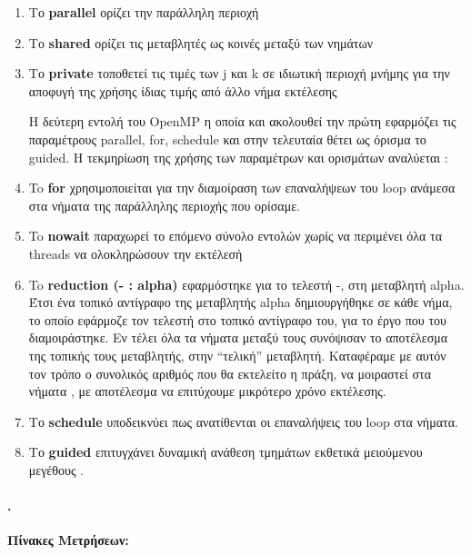 \documentclass[greek,booktabs,8pt,flagBlueCMYK]{report}
\begin{document}
\begin{enumerate}
  \item Το \textbf{parallel} ορίζει την παράλληλη περιοχή
  \item Το \textbf{shared} ορίζει τις μεταβλητές ως κοινές μεταξύ των νημάτων
  \item Το \textbf{private} τοποθετεί τις τιμές των j και k σε ιδιωτική περιοχή μνήμης για την αποφυγή της χρήσης ίδιας τιμής από άλλο νήμα εκτέλεσης \newline

Η δεύτερη εντολή του OpenMP η οποία και ακολουθεί την πρώτη εφαρμόζει τις παραμέτρους parallel, for, schedule και στην τελευταία θέτει ως όρισμα το guided. Η τεκμηρίωση της χρήσης των παραμέτρων και ορισμάτων αναλύεται :

  \item To \textbf{for} χρησιμοποιείται για την διαμοίραση των επαναλήψεων του loop ανάμεσα στα νήματα της παράλληλης περιοχής που ορίσαμε.
  \item To \textbf{nowait} παραχωρεί το επόμενο σύνολο εντολών χωρίς να περιμένει όλα τα threads να ολοκληρώσουν την εκτέλεσή
  \item To \textbf{reduction (- : alpha)}  εφαρμόστηκε για το τελεστή -, στη μεταβλητή alpha. Έτσι ένα τοπικό αντίγραφο της μεταβλητής alpha
        δημιουργήθηκε σε κάθε νήμα, το οποίο εφάρμοζε τον τελεστή στο τοπικό αντίγραφο του, για το έργο που του διαμοιράστηκε.
        Εν τέλει όλα τα νήματα μεταξύ τους συνόψισαν το αποτέλεσμα της τοπικής τους μεταβλητής, στην “τελική” μεταβλητή.
        Καταφέραμε με αυτόν τον τρόπο ο συνολικός αριθμός που θα εκτελείτο η πράξη, να μοιραστεί στα νήματα , με αποτέλεσμα να
        επιτύχουμε μικρότερο χρόνο εκτέλεσης.
  \item Το \textbf{schedule} υποδεικνύει πως ανατίθενται οι επαναλήψεις του loop στα νήματα.
  \item Το \textbf{guided} επιτυγχάνει δυναμική ανάθεση τμημάτων εκθετικά μειούμενου μεγέθους .
\end{enumerate}

\paragraph{.} \textbf{Πίνακες Μετρήσεων:}\newline
\end{document}
